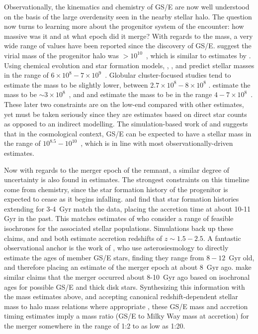 Observationally, the kinematics and chemistry of GS/E are now well understood on the basis of the large overdensity seen in the nearby stellar halo. The question now turns to learning more about the progenitor system of the encounter: how massive was it and at what epoch did it merge? With regards to the mass, a very wide range of values have been reported since the discovery of GS/E. \textcite{belokurov18} suggest the virial mass of the progenitor halo was $> 10^{10}$~\Msun, which is similar to estimates by \textcite{das20}. Using chemical evolution and star formation models, \textcite{helmi18}, \textcite{vincenzo19}, and \textcite{feuillet20} predict stellar masses in the range of $6\times10^{8} - 7\times10^{9}$~\Msun. Globular cluster-focused studies tend to estimate the mass to be slightly lower, between $2.7\times10^{8}-8\times10^{8}$ \parencite{kruijssen20,forbes20}. \textcite{mackereth20} estimate the mass to be $\sim 3\times10^{8}$~\Msun, and \textcite{naidu20} and \textcite{naidu21} estimate the mass to be in the range $4-7\times10^{8}$~\Msun. These later two constraints are on the low-end compared with other estimates, yet must be taken seriously since they are estimates based on direct star counts as opposed to an indirect modelling. The simulation-based work of \textcite{fattahi19} and \textcite{mackereth19a} suggests that in the cosmological context, GS/E can be expected to have a stellar mass in the range of $10^{8.5}-10^{10}$~\Msun, which is in line with most observationally-driven estimates.

Now with regards to the merger epoch of the remnant, a similar degree of uncertainty is also found in estimates. The strongest constraints on this timeline come from chemistry, since the star formation history of the progenitor is expected to cease as it begins infalling. \textcite{vincenzo19} and \textcite{sanders21} find that star formation histories extending for 3-4~Gyr match the data, placing the accretion time at about 10-11 Gyr in the past. This matches estimates of \textcite{helmi18} who consider a range of feasible isochrones for the associated stellar populations. Simulations back up these claims, and \textcite{fattahi19} and \textcite{mackereth19a} both estimate accretion redshifts of $z \sim 1.5-2.5$. A fantastic observational anchor is the work of \textcite{montalban21}, who use asterosiesmology to directly estimate the ages of member GS/E stars, finding they range from $8-12$~Gyr old, and therefore placing an estimate of the merger epoch at about 8~Gyr ago. \textcite{gallart19} make similar claims that the merger occurred about 8-10~Gyr ago based on isochronal ages for possible GS/E and thick disk stars. Synthesizing this information with the mass estimates above, and accepting canonical redshift-dependent stellar mass to halo mass relations where appropriate \parencite[e.g.][]{read17}, these GS/E mass and accretion timing estimates imply a mass ratio (GS/E to Milky Way mass at accretion) for the merger somewhere in the range of 1:2 to as low as 1:20.

